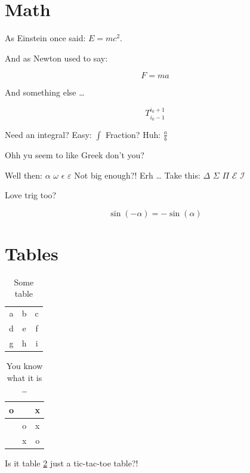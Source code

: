 \documentclass[12pt, letterpaper]{article}
\begin{document}
\section{Math}

As Einstein once said: $E=mc^2$.

And as Newton used to say:

\[F=ma\]

And something else \dots

\[T^{i_0+1}_{i_0-1}\]

Need an integral? Easy: $\int$
Fraction? Huh: $\frac{a}{b}$

Ohh yu seem to like Greek don't you?

Well then: $\alpha$ $\omega$ $\epsilon$ $\varepsilon$
Not big enough?! Erh \dots
Take this: $\Delta$ $\Sigma$ $\Pi$ $\mathcal{E}$ $\mathcal{I}$

Love trig too?

\[\sin(-\alpha) = -\sin(\alpha)\]

\section{Tables}

\begin{table}
    \centering
    \begin{tabular}{c c c}
        a & b & c \\
        d & e & f \\
        g & h & i
    \end{tabular}
    \caption{Some table}
    \label{table:first-table}
\end{table}

\begin{table}
    \centering

    \begin{tabular}{c | c | c}
        o &   & x \\
        \hline
          & o & x \\
        \hline
          & x & o
    \end{tabular}
\tableofcontents  
\caption{You know what it is \dots}
    \label{table:tic-tac-toe}
\end{table}

Is it table \ref{table:tic-tac-toe} just a tic-tac-toe table?!
\end{document}
